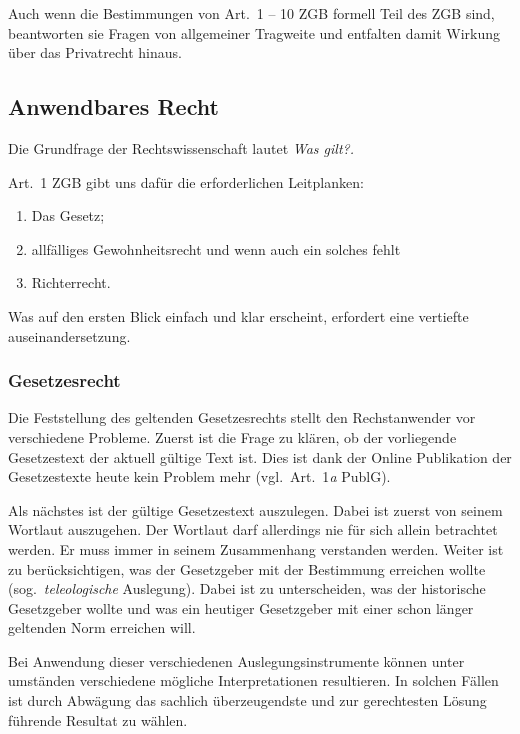 Auch wenn die Bestimmungen von Art.\ 1 -- 10 ZGB formell Teil des ZGB
sind, beantworten sie Fragen von allgemeiner Tragweite\autocite[Seite
31]{tuor_schnyder} und entfalten damit Wirkung über das Privatrecht
hinaus\autocite[\S\ 3]{riemer_einleitungsartikel}.

\subsection{Anwendbares Recht}
Die Grundfrage der Rechtswissenschaft lautet \itshape \flqq Was
gilt?\frqq\normalfont.

Art.\ 1 ZGB gibt uns dafür die erforderlichen Leitplanken:

\begin{enumerate}
    \item Das Gesetz;
    \item allfälliges Gewohnheitsrecht und wenn auch ein solches fehlt
    \item Richterrecht\autocite[\S\ 4 N.\ 2]{riemer_einleitungsartikel}.
\end{enumerate}

Was auf den ersten Blick einfach und klar erscheint, erfordert eine
vertiefte auseinandersetzung.

\subsubsection{Gesetzesrecht}
Die Feststellung des geltenden Gesetzesrechts stellt den Rechstanwender
vor verschiedene Probleme. Zuerst ist die Frage zu klären, ob der
vorliegende Gesetzestext der aktuell gültige Text ist. Dies ist dank der
Online Publikation der Gesetzestexte heute kein Problem mehr (vgl.\
Art.\ 1\textit{a} PublG). 

Als nächstes ist der gültige Gesetzestext
auszulegen. Dabei ist zuerst von seinem Wortlaut auszugehen. Der
Wortlaut darf allerdings nie für sich allein betrachtet werden. Er muss
immer in seinem Zusammenhang verstanden werden\autocite[\S\ 4 N.\
35]{riemer_einleitungsartikel}. Weiter ist zu berücksichtigen, was der
Gesetzgeber mit der Bestimmung erreichen wollte (sog.\
\textit{teleologische} Auslegung). Dabei ist zu unterscheiden, was der
historische Gesetzgeber wollte und was ein heutiger Gesetzgeber mit
einer schon länger geltenden Norm erreichen will.

Bei Anwendung dieser verschiedenen Auslegungsinstrumente können unter
umständen verschiedene mögliche Interpretationen resultieren. In solchen
Fällen ist durch Abwägung das sachlich überzeugendste und zur
gerechtesten Lösung führende Resultat zu wählen\autocite[\S\ 4 N.\
59]{riemer_einleitungsartikel}.

